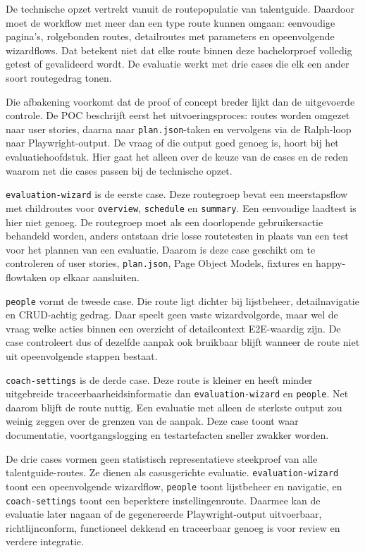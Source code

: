 De technische opzet vertrekt vanuit de routepopulatie van talentguide. Daardoor moet de workflow met meer dan een type route kunnen omgaan: eenvoudige pagina's, rolgebonden routes, detailroutes met parameters en opeenvolgende wizardflows. Dat betekent niet dat elke route binnen deze bachelorproef volledig getest of gevalideerd wordt. De evaluatie werkt met drie cases die elk een ander soort routegedrag tonen.

Die afbakening voorkomt dat de proof of concept breder lijkt dan de uitgevoerde controle. De POC beschrijft eerst het uitvoeringsproces: routes worden omgezet naar user stories, daarna naar \texttt{plan.json}-taken en vervolgens via de Ralph-loop naar Playwright-output. De vraag of die output goed genoeg is, hoort bij het evaluatiehoofdstuk. Hier gaat het alleen over de keuze van de cases en de reden waarom net die cases passen bij de technische opzet.

\texttt{evaluation-wizard} is de eerste case. Deze routegroep bevat een meerstapsflow met childroutes voor \texttt{overview}, \texttt{schedule} en \texttt{summary}. Een eenvoudige laadtest is hier niet genoeg. De routegroep moet als een doorlopende gebruikersactie behandeld worden, anders ontstaan drie losse routetesten in plaats van een test voor het plannen van een evaluatie. Daarom is deze case geschikt om te controleren of user stories, \texttt{plan.json}, Page Object Models, fixtures en happy-flowtaken op elkaar aansluiten.

\texttt{people} vormt de tweede case. Die route ligt dichter bij lijstbeheer, detailnavigatie en CRUD-achtig gedrag. Daar speelt geen vaste wizardvolgorde, maar wel de vraag welke acties binnen een overzicht of detailcontext E2E-waardig zijn. De case controleert dus of dezelfde aanpak ook bruikbaar blijft wanneer de route niet uit opeenvolgende stappen bestaat.

\texttt{coach-settings} is de derde case. Deze route is kleiner en heeft minder uitgebreide traceerbaarheidsinformatie dan \texttt{evaluation-wizard} en \texttt{people}. Net daarom blijft de route nuttig. Een evaluatie met alleen de sterkste output zou weinig zeggen over de grenzen van de aanpak. Deze case toont waar documentatie, voortgangslogging en testartefacten sneller zwakker worden.

De drie cases vormen geen statistisch representatieve steekproef van alle talentguide-routes. Ze dienen als casusgerichte evaluatie. \texttt{evaluation-wizard} toont een opeenvolgende wizardflow, \texttt{people} toont lijstbeheer en navigatie, en \texttt{coach-settings} toont een beperktere instellingenroute. Daarmee kan de evaluatie later nagaan of de gegenereerde Playwright-output uitvoerbaar, richtlijnconform, functioneel dekkend en traceerbaar genoeg is voor review en verdere integratie.

